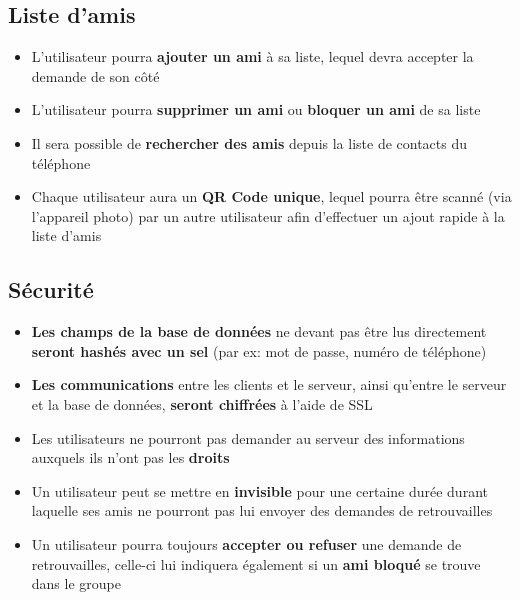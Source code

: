 \documentclass[french]{article}
\begin{document}
		\subsection{Liste d'amis}
			\begin{itemize}
				\item L'utilisateur pourra \textbf{ajouter un ami} à sa liste, lequel devra accepter la demande de son côté
				\item L'utilisateur pourra \textbf{supprimer un ami} ou \textbf{bloquer un ami} de sa liste
				\item Il sera possible de \textbf{rechercher des amis} depuis la liste de contacts du téléphone
				\item Chaque utilisateur aura un \textbf{QR Code unique}, lequel pourra être scanné (via l'appareil photo) par un autre utilisateur afin d'effectuer un ajout rapide à la liste d'amis 
			\end{itemize}
		
		\subsection{Sécurité}
			\begin{itemize}
				\item \textbf{Les champs de la base de données} ne devant pas être lus directement \textbf{seront hashés avec un sel} (par ex: mot de passe, numéro de téléphone)
				\item \textbf{Les communications} entre les clients et le serveur, ainsi qu'entre le serveur et la base de données, \textbf{seront chiffrées} à l'aide de SSL
				\item Les utilisateurs ne pourront pas demander au serveur des informations auxquels ils n'ont pas les \textbf{droits} 
				\item Un utilisateur peut se mettre en \textbf{invisible} pour une certaine durée durant laquelle ses amis ne pourront pas lui envoyer des demandes de retrouvailles
				\item Un utilisateur pourra toujours \textbf{accepter ou refuser} une demande de retrouvailles, celle-ci lui indiquera également si un \textbf{ami bloqué} se trouve dans le groupe
			\end{itemize}
		
\end{document}
